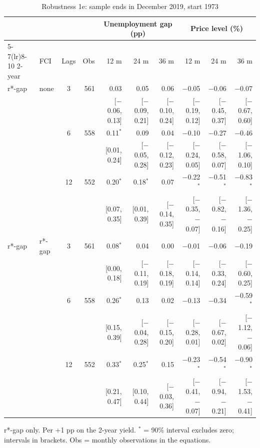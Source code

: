 \begin{table}[p]\centering\footnotesize\setlength{\tabcolsep}{2.2pt}
\caption{Robustness 1e: sample ends in December 2019, start 1973}\label{tab:R1e}
\begin{tabular}{llcrrrrrrr}\toprule
 & & & & \multicolumn{3}{c}{Unemployment gap (pp)} & \multicolumn{3}{c}{Price level (\%)}\\ \cmidrule(lr){5-7}\cmidrule(lr){8-10}
2-year & FCI & Lags & Obs & 12 m & 24 m & 36 m & 12 m & 24 m & 36 m\\ \midrule
r*-gap & none & 3 & 561 & 0.03 & 0.05 & 0.06 & $-$0.05 & $-$0.06 & $-$0.07\\
 & & & & {\scriptsize [$-$0.06, 0.13]} & {\scriptsize [$-$0.09, 0.21]} & {\scriptsize [$-$0.10, 0.24]} & {\scriptsize [$-$0.19, 0.12]} & {\scriptsize [$-$0.45, 0.37]} & {\scriptsize [$-$0.67, 0.60]}\\
 &  & 6 & 558 & 0.11$^{*}$ & 0.09 & 0.04 & $-$0.10 & $-$0.27 & $-$0.46\\
 & & & & {\scriptsize [0.01, 0.24]} & {\scriptsize [$-$0.05, 0.28]} & {\scriptsize [$-$0.12, 0.23]} & {\scriptsize [$-$0.24, 0.05]} & {\scriptsize [$-$0.58, 0.07]} & {\scriptsize [$-$1.06, 0.10]}\\
 &  & 12 & 552 & 0.20$^{*}$ & 0.18$^{*}$ & 0.07 & $-$0.22$^{*}$ & $-$0.51$^{*}$ & $-$0.83$^{*}$\\
 & & & & {\scriptsize [0.07, 0.35]} & {\scriptsize [0.01, 0.39]} & {\scriptsize [$-$0.14, 0.35]} & {\scriptsize [$-$0.35, $-$0.07]} & {\scriptsize [$-$0.82, $-$0.16]} & {\scriptsize [$-$1.36, $-$0.25]}\\
r*-gap & r*-gap & 3 & 561 & 0.08$^{*}$ & 0.04 & 0.00 & $-$0.01 & $-$0.06 & $-$0.19\\
 & & & & {\scriptsize [0.00, 0.18]} & {\scriptsize [$-$0.11, 0.19]} & {\scriptsize [$-$0.18, 0.19]} & {\scriptsize [$-$0.14, 0.14]} & {\scriptsize [$-$0.33, 0.24]} & {\scriptsize [$-$0.60, 0.25]}\\
 &  & 6 & 558 & 0.26$^{*}$ & 0.13 & 0.02 & $-$0.13 & $-$0.34 & $-$0.59$^{*}$\\
 & & & & {\scriptsize [0.15, 0.39]} & {\scriptsize [$-$0.04, 0.28]} & {\scriptsize [$-$0.15, 0.20]} & {\scriptsize [$-$0.28, 0.01]} & {\scriptsize [$-$0.67, 0.02]} & {\scriptsize [$-$1.12, $-$0.06]}\\
 &  & 12 & 552 & 0.33$^{*}$ & 0.25$^{*}$ & 0.15 & $-$0.23$^{*}$ & $-$0.54$^{*}$ & $-$0.90$^{*}$\\
 & & & & {\scriptsize [0.21, 0.47]} & {\scriptsize [0.10, 0.44]} & {\scriptsize [$-$0.03, 0.36]} & {\scriptsize [$-$0.41, $-$0.07]} & {\scriptsize [$-$0.94, $-$0.21]} & {\scriptsize [$-$1.53, $-$0.41]}\\
\bottomrule\end{tabular}
\par\smallskip\parbox{0.96\linewidth}{\scriptsize r*-gap only. Per +1 pp on the 2-year yield. $^{*}$ = 90\% interval excludes zero; intervals in brackets. Obs = monthly observations in the equations.}
\end{table}
